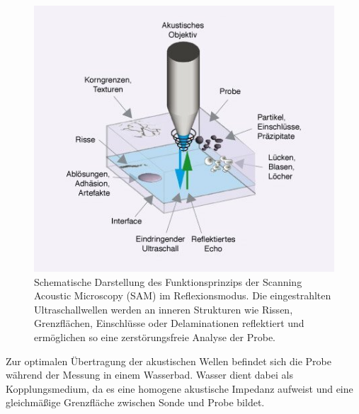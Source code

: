  \newpage
\vspace{0.2cm}
\begin{figure}
    \centering
    \includegraphics[scale=0.8]{Bilder/samtheorie}
    \caption{Schematische Darstellung des Funktionsprinzips der Scanning Acoustic Microscopy (SAM) im Reflexionsmodus. Die eingestrahlten Ultraschallwellen werden an inneren Strukturen wie Rissen, Grenzflächen, Einschlüsse oder Delaminationen reflektiert und ermöglichen so eine zerstörungsfreie Analyse der Probe.\cite{1}}
    \vspace{0.2cm}
    \label{Abb.1: Schematische Darstellung des Funktionsprinzips der Scanning Acoustic Microscopy (SAM) im Reflexionsmodus. Die eingestrahlten Ultraschallwellen werden an inneren Strukturen wie Rissen, Grenzflächen, Einschlüsse oder Delaminationen reflektiert und ermöglichen so eine zerstörungsfreie Analyse der Probe. }
\end{figure} 
\vspace{0.2cm}
Zur optimalen Übertragung der akustischen Wellen befindet sich die Probe während der Messung in einem Wasserbad. Wasser dient dabei als Kopplungsmedium, da es eine homogene akustische Impedanz aufweist und eine gleichmäßige Grenzfläche zwischen Sonde und Probe bildet.
